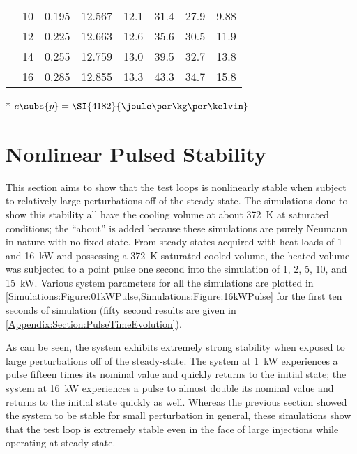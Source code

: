 \begin{table}[b]
\begin{tabular}{cccccccc}
              & 10 & 0.195 & 12.567 & 12.1 & 31.4  & 27.9 & 9.88 \\[0.2em]
              & 12 & 0.225 & 12.663 & 12.6 & 35.6  & 30.5 & 11.9 \\[0.2em]
              & 14 & 0.255 & 12.759 & 13.0 & 39.5  & 32.7 & 13.8 \\[0.2em]
              & 16 & 0.285 & 12.855 & 13.3 & 43.3  & 34.7 & 15.8 \\[0.2em]
        \bottomrule
    \end{tabular}
    \vskip0pt
    * $c\subs{p} = \SI{4182}{\joule\per\kg\per\kelvin}$
\end{table}

\clearpage

\section{Nonlinear Pulsed Stability}
This section aims to show that the test loops is nonlinearly stable when subject to relatively large perturbations off of the steady-state.
The simulations done to show this stability all have the cooling volume at about \SI{372}{\kelvin} at saturated conditions; the ``about'' is added because these simulations are purely Neumann in nature with no fixed state.
From steady-states acquired with heat loads of \num{1} and \SI{16}{\kW} and possessing a \SI{372}{\kelvin} saturated cooled volume, the heated volume was subjected to a point pulse one second into the simulation of \num{1}, \num{2}, \num{5}, \num{10}, and \SI{15}{\kW}.
Various system parameters for all the simulations are plotted in \cref{Simulations:Figure:01kWPulse,Simulations:Figure:16kWPulse} for the first ten seconds of simulation (fifty second results are given in \cref{Appendix:Section:PulseTimeEvolution}).

As can be seen, the system exhibits extremely strong stability when exposed to large perturbations off of the steady-state.
The system at \SI{1}{\kW} experiences a pulse fifteen times its nominal value and quickly returns to the initial state; the system at \SI{16}{\kW} experiences a pulse to almost double its nominal value and returns to the initial state quickly as well.
Whereas the previous section showed the system to be stable for small perturbation in general, these simulations show that the test loop is extremely stable even in the face of large injections while operating at steady-state.


